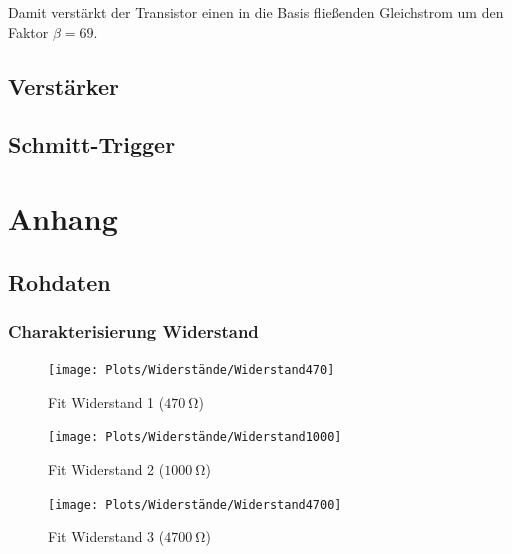 \documentclass[12pt,twoside,a4paper]{scrartcl}
\begin{document}
				Damit verstärkt der Transistor einen in die Basis fließenden Gleichstrom um den Faktor $ \beta = 69$.

    \subsection{Verstärker}



    \subsection{Schmitt-Trigger}



\section{Anhang}
	\subsection{Rohdaten}
		\subsubsection{Charakterisierung Widerstand}
		\label{Daten::Widerstand}

			\begin{figure}[H]
				\centering
				\begin{minipage}{0.49 \textwidth}
						\texttt{[image: Plots/Widerstände/Widerstand470]}
				\caption{Fit Widerstand 1 ($\SI{470}{\ohm}$)}
				\end{minipage}
				\begin{minipage}{0.49 \textwidth}
						\texttt{[image: Plots/Widerstände/Widerstand1000]}
				\caption{Fit Widerstand 2 ($\SI{1000}{\ohm}$)}
				\end{minipage}
			\end{figure}

			\begin{figure}[H]
				\centering
				\texttt{[image: Plots/Widerstände/Widerstand4700]}
				\caption{Fit Widerstand 3 ($\SI{4700}{\ohm}$)}
		\end{figure}
\end{document}
